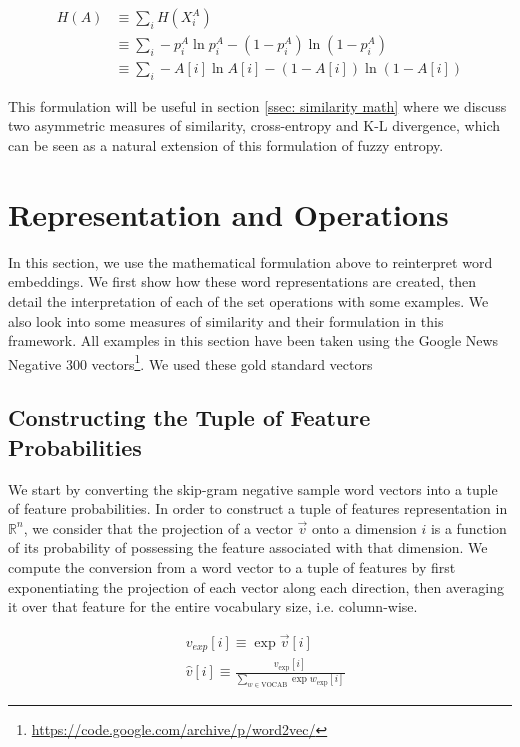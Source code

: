 \documentclass[11pt]{book}
\begin{document}
{\footnotesize \begin{align*} H(A) &\equiv \sum_i H(X^A_i) \\ &\equiv \sum_i
-p_i^A \ln p_i^A - (1 - p_i^A) \ln (1 - p_i^A) \\ &\equiv  \sum_i -A[i] \ln
A[i] - (1 - A[i]) \ln (1 - A[i]) \end{align*} }

This formulation will be useful in section \ref{ssec: similarity math} where we
discuss two asymmetric measures of similarity, cross-entropy and K-L
divergence, which can be seen as a natural extension of this formulation of
fuzzy entropy.

\section{Representation and Operations} \label{sec: meat of the paper}

In this section, we use the mathematical formulation above to reinterpret word
embeddings. We first show how these word representations are created, then
detail the interpretation of each of the set operations with some examples. We
also look into some measures of similarity and their formulation in this
framework. All examples in this section have been taken using the Google News
Negative 300
vectors\footnote{\url{https://code.google.com/archive/p/word2vec/}}. We used
these gold standard vectors 

\subsection{Constructing the Tuple of Feature Probabilities} \label{ssec:
constructing}

We start by converting the skip-gram negative sample word vectors into a tuple
of feature probabilities. In order to construct a tuple of features
representation in $\mathbb{R}^n$, we consider that the projection of a vector
$\vec v$ onto a dimension $i$ is a function of its probability of possessing
the feature associated with that dimension.  We compute the conversion from a
word vector to a tuple of features by first exponentiating the projection of
each vector along each direction, then averaging it over that feature for the
entire vocabulary size, i.e. column-wise.

{\footnotesize \begin{align*} & v_{exp}[i] \equiv \exp \vec v[i] \\ & \hat v[i]
\equiv \frac{v_{\text{exp}}[i]}{\sum_{w \in \text{VOCAB}} \exp
w_{\text{exp}}[i]} \end{align*} }
\end{document}
